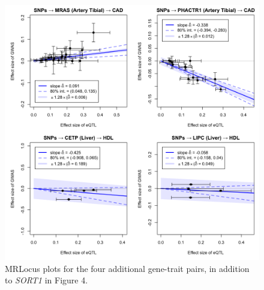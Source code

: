 \documentclass[11pt]{article}
\begin{document}
\begin{figure}[!ht]
  \centering
  \includegraphics[width=\textwidth]{figs/realloci.png}
  \caption{MRLocus plots for the four additional gene-trait pairs, in
    addition to \emph{SORT1} in Figure 4.}
\end{figure}
\end{document}
